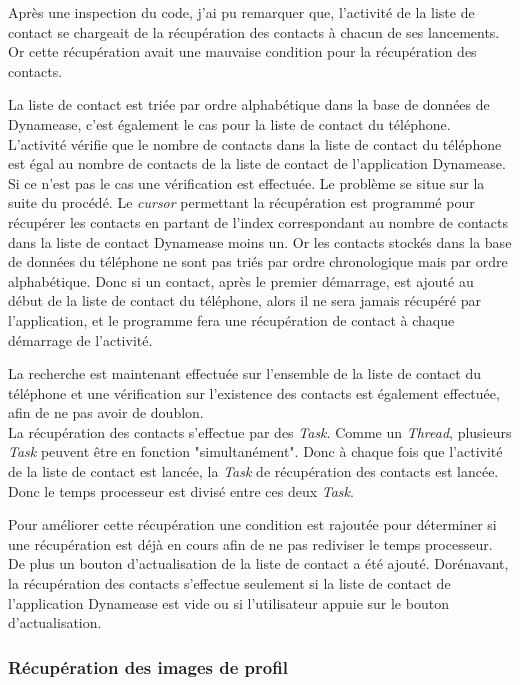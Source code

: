 Après une inspection du code, j'ai pu remarquer que, l'activité de la liste de contact se chargeait de la récupération des contacts à chacun de ses lancements. Or cette récupération avait une mauvaise condition pour la récupération des contacts.

La liste de contact est triée par ordre alphabétique dans la base de données de Dynamease, c'est également le cas pour la liste de contact du téléphone. L'activité vérifie que le nombre de contacts dans la liste de contact du téléphone est égal au nombre de contacts de la liste de contact de l'application Dynamease. Si ce n'est pas le cas une vérification est effectuée. Le problème se situe sur la suite du procédé. Le \textit{cursor} permettant la récupération est programmé pour récupérer les contacts en partant de l'index correspondant au nombre de contacts dans la liste de contact Dynamease moins un. Or les contacts stockés dans la base de données du téléphone ne sont pas triés par ordre chronologique mais par ordre alphabétique. Donc si un contact, après le premier démarrage, est ajouté au début de la liste de contact du téléphone, alors il ne sera jamais récupéré par l'application, et le programme fera une récupération de contact à chaque démarrage de l'activité.

La recherche est maintenant effectuée sur l'ensemble de la liste de contact du téléphone et une vérification sur l'existence des contacts est également effectuée, afin de ne pas avoir de doublon.\\

La récupération des contacts s'effectue par des \textit{Task}. Comme un \textit{Thread}, plusieurs \textit{Task} peuvent être en fonction "simultanément". Donc à chaque fois que l'activité de la liste de contact est lancée, la \textit{Task} de récupération des contacts est lancée. Donc le temps processeur est divisé entre ces deux \textit{Task}.

Pour améliorer cette récupération une condition est rajoutée pour déterminer si une récupération est déjà en cours afin de ne pas rediviser le temps processeur. De plus un bouton d'actualisation de la liste de contact a été ajouté. Dorénavant, la récupération des contacts s'effectue seulement si la liste de contact de l'application Dynamease est vide ou si l'utilisateur appuie sur le bouton d'actualisation.

\subsubsection{Récupération des images de profil}

